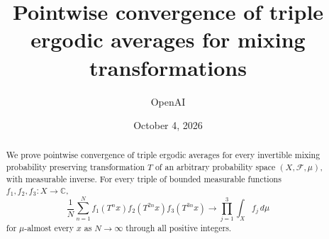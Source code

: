 \documentclass[11pt,reqno]{amsart}
\title[Pointwise convergence of triple averages]{Pointwise convergence of triple ergodic averages for mixing transformations}
\author{OpenAI}
\date{October 4, 2026}
\begin{document}
\begin{abstract}
We prove pointwise convergence of triple ergodic averages for every
invertible mixing probability preserving transformation \(T\) of an
arbitrary probability space \((X,\mathcal F,\mu)\), with measurable inverse.
For every triple of bounded measurable functions
\(f_1,f_2,f_3:X\to\mathbb C\),
\[
 \frac1N\sum_{n=1}^N f_1(T^nx)f_2(T^{2n}x)f_3(T^{3n}x)
 \longrightarrow \prod_{j=1}^3\int_X f_j\,d\mu
\]
for \(\mu\)-almost every \(x\) as \(N\to\infty\) through all positive
integers.
\end{abstract}
\maketitle
\tableofcontents









\end{document}
